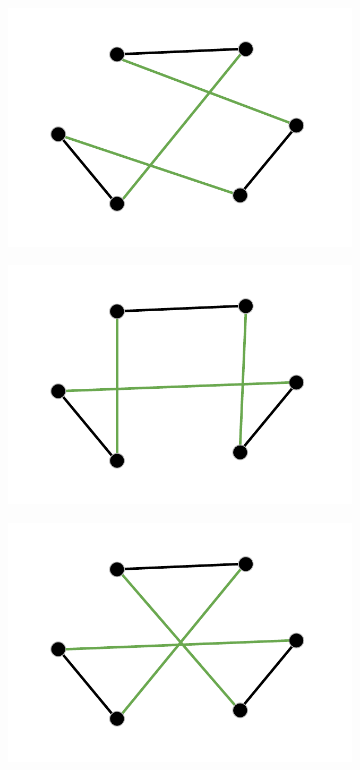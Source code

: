 \begin{figure}[h!]
\begin{subfigure}[b]{0.24\linewidth}
     \caption{}
  \end{subfigure}
  \begin{subfigure}[b]{0.24\linewidth}
    \includegraphics[width=\linewidth]{media/threeopt6.pdf}
    \caption{}
  \end{subfigure}
  \begin{subfigure}[b]{0.24\linewidth}
    \includegraphics[width=\linewidth]{media/threeopt7.pdf}
    \caption{}
  \end{subfigure}
  \begin{subfigure}[b]{0.24\linewidth}
    \includegraphics[width=\linewidth]{media/threeopt8.pdf}

\end{subfigure}
\end{figure}
